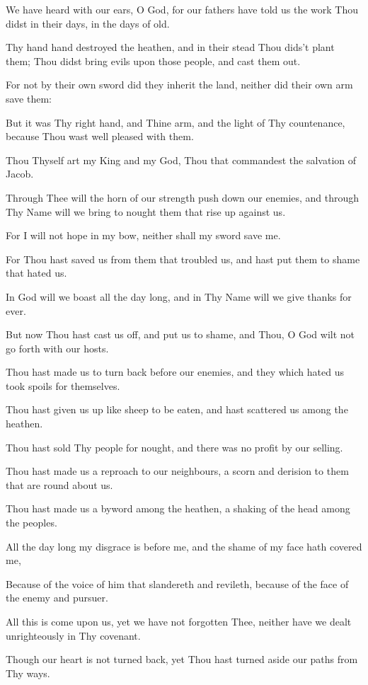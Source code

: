 We have heard with our ears, O God, for our fathers have told us the work Thou didst in their days, in the days of old.

Thy hand hand destroyed the heathen, and in their stead Thou dids't plant them; Thou didst bring evils upon those people, and cast them out.

For not by their own sword did they inherit the land, neither did their own arm save them:

But it was Thy right hand, and Thine arm, and the light of Thy countenance, because Thou wast well pleased with them.

Thou Thyself art my King and my God, Thou that commandest the salvation of Jacob.

Through Thee will the horn of our strength push down our enemies, and through Thy Name will we bring to nought them that rise up against us.

For I will not hope in my bow, neither shall my sword save me.

For Thou hast saved us from them that troubled us, and hast put them to shame that hated us.

In God will we boast all the day long, and in Thy Name will we give thanks for ever.

But now Thou hast cast us off, and put us to shame, and Thou, O God wilt not go forth with our hosts.

Thou hast made us to turn back before our enemies, and they which hated us took spoils for themselves.

Thou hast given us up like sheep to be eaten, and hast scattered us among the heathen.

Thou hast sold Thy people for nought, and there was no profit by our selling.

Thou hast made us a reproach to our neighbours, a scorn and derision to them that are round about us.

Thou hast made us a byword among the heathen, a shaking of the head among the peoples.

All the day long my disgrace is before me, and the shame of my face hath covered me,

Because of the voice of him that slandereth and revileth, because of the face of the enemy and pursuer.

All this is come upon us, yet we have not forgotten Thee, neither have we dealt unrighteously in Thy covenant.

Though our heart is not turned back, yet Thou hast turned aside our paths from Thy ways.

